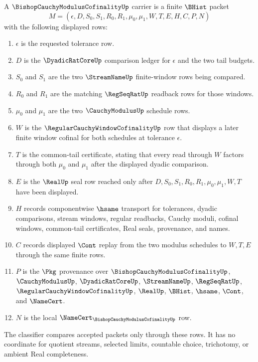 \begin{definition}
\label{def:bishop-cauchy-modulus-cofinality-carrier}
A $\BishopCauchyModulusCofinalityUp$ carrier is a finite $\BHist$ packet
$$
M=(\epsilon,D,S_0,S_1,R_0,R_1,\mu_0,\mu_1,W,T,E,H,C,P,N)
$$
with the following displayed rows:
\begin{enumerate}
\item $\epsilon$ is the requested tolerance row.
\item $D$ is the $\DyadicRatCoreUp$ comparison ledger for $\epsilon$ and the two tail budgets.
\item $S_0$ and $S_1$ are the two $\StreamNameUp$ finite-window rows being compared.
\item $R_0$ and $R_1$ are the matching $\RegSeqRatUp$ readback rows for those windows.
\item $\mu_0$ and $\mu_1$ are the two $\CauchyModulusUp$ schedule rows.
\item $W$ is the $\RegularCauchyWindowCofinalityUp$ row that displays a later finite window cofinal for both schedules at tolerance $\epsilon$.
\item $T$ is the common-tail certificate, stating that every read through $W$ factors through both $\mu_0$ and $\mu_1$ after the displayed dyadic comparison.
\item $E$ is the $\RealUp$ seal row reached only after $D,S_0,S_1,R_0,R_1,\mu_0,\mu_1,W,T$ have been displayed.
\item $H$ records componentwise $\hsame$ transport for tolerances, dyadic comparisons, stream windows, regular readbacks, Cauchy moduli, cofinal windows, common-tail certificates, Real seals, provenance, and names.
\item $C$ records displayed $\Cont$ replay from the two modulus schedules to $W,T,E$ through the same finite rows.
\item $P$ is the $\Pkg$ provenance over $\BishopCauchyModulusCofinalityUp$, $\CauchyModulusUp$, $\DyadicRatCoreUp$, $\StreamNameUp$, $\RegSeqRatUp$, $\RegularCauchyWindowCofinalityUp$, $\RealUp$, $\BHist$, $\hsame$, $\Cont$, and $\NameCert$.
\item $N$ is the local $\NameCert_{\BishopCauchyModulusCofinalityUp}$ row.
\end{enumerate}
The classifier compares accepted packets only through these rows. It has no coordinate for quotient streams, selected limits, countable choice, trichotomy, or ambient Real completeness.
\end{definition}

